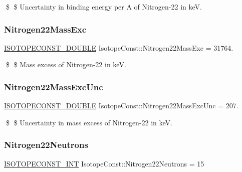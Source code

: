 \$ \$ Uncertainty in binding energy per A of Nitrogen-\/22 in keV. \mbox{\label{group___isotope_const-_nitrogen-_n22_gad9d8baff76ca434e03ee18fba6dd92f5}} 
\subsubsection{\texorpdfstring{Nitrogen22\+Mass\+Exc}{Nitrogen22MassExc}}
{\footnotesize\ttfamily \mbox{\hyperlink{group___isotope_const-_macros_ga8f45a7272ce02c0b4c65c44636ed719a}{I\+S\+O\+T\+O\+P\+E\+C\+O\+N\+S\+T\+\_\+\+D\+O\+U\+B\+LE}} Isotope\+Const\+::\+Nitrogen22\+Mass\+Exc = 31764.}

\$ \$ Mass excess of Nitrogen-\/22 in keV. \mbox{\label{group___isotope_const-_nitrogen-_n22_ga4c931f248d4291490c8afb21b3e5fef2}} 
\subsubsection{\texorpdfstring{Nitrogen22\+Mass\+Exc\+Unc}{Nitrogen22MassExcUnc}}
{\footnotesize\ttfamily \mbox{\hyperlink{group___isotope_const-_macros_ga8f45a7272ce02c0b4c65c44636ed719a}{I\+S\+O\+T\+O\+P\+E\+C\+O\+N\+S\+T\+\_\+\+D\+O\+U\+B\+LE}} Isotope\+Const\+::\+Nitrogen22\+Mass\+Exc\+Unc = 207.}

\$ \$ Uncertainty in mass excess of Nitrogen-\/22 in keV. \mbox{\label{group___isotope_const-_nitrogen-_n22_ga8da39a8ac6af648049b8f54997085759}} 
\subsubsection{\texorpdfstring{Nitrogen22\+Neutrons}{Nitrogen22Neutrons}}
{\footnotesize\ttfamily \mbox{\hyperlink{group___isotope_const-_macros_ga5f18360b3e99483a35c32d789e62621c}{I\+S\+O\+T\+O\+P\+E\+C\+O\+N\+S\+T\+\_\+\+I\+NT}} Isotope\+Const\+::\+Nitrogen22\+Neutrons = 15}

